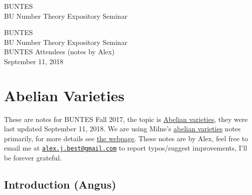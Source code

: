\documentclass[10pt,]{book}
\numberwithin{equation}{section}
\begin{document}
\frontmatter
\thispagestyle{empty}
{\centering
\vspace*{0.28\textheight}
{\Huge BUNTES}\\[2\baselineskip]
{\LARGE BU Number Theory Expository Seminar}\\
}
\clearpage
\thispagestyle{empty}
\null%
\clearpage
\thispagestyle{empty}
{\centering
\vspace*{0.14\textheight}
{\Huge BUNTES}\\[\baselineskip]
{\LARGE BU Number Theory Expository Seminar}\\[3\baselineskip]
{\Large BUNTES Attendees (notes by Alex)}\\[3\baselineskip]
{\Large September 11, 2018}\\}
\clearpage
\thispagestyle{empty}
\null\clearpage
\setcounter{tocdepth}{1}
\renewcommand*\contentsname{Contents}
\tableofcontents
\mainmatter
%
%
\typeout{************************************************}
\typeout{************************************************}
%
\chapter[{Abelian Varieties}]{Abelian Varieties}\label{chapter-abelian-varieties}
\hypertarget{p-1}{}%
These are notes for BUNTES Fall 2017, the topic is \hyperref[def-buntes-abvar]{Abelian varieties}, they were last updated September 11, 2018. We are using Milne's \hyperref[def-buntes-abvar]{abelian varieties} notes primarily, for more details see \href{http://math.bu.edu/people/angusmca/buntes/fall2017.html}{the webpage}. These notes are by Alex, feel free to email me at \href{mailto:alex.j.best@gmail.com}{\nolinkurl{alex.j.best@gmail.com}} to report typos/suggest improvements, I'll be forever grateful.%
%
%
\typeout{************************************************}
\typeout{************************************************}
%
\section[{Introduction (Angus)}]{Introduction (Angus)}\label{sec-av-intro}
%
%
\typeout{************************************************}
\typeout{************************************************}
%
\end{document}
